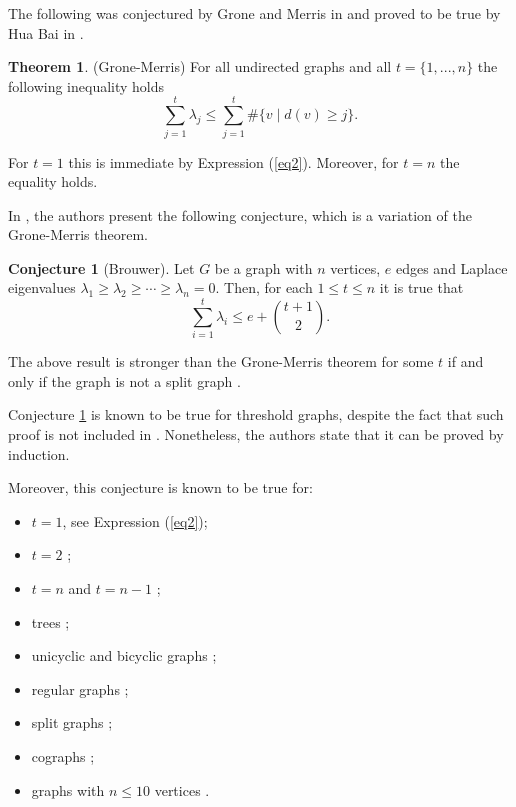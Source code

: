 \documentclass[11pt]{article}
\theoremstyle{definition}
\newtheorem{thm}{Theorem}
\newtheorem{conj}{Conjecture}
\begin{document}
The following was conjectured by Grone and Merris in \cite{GroneMerris} and proved to be true by Hua Bai in \cite{HuaBai}.

\begin{thm}(Grone-Merris)
    For all undirected graphs and all $t = \{1, ..., n\}$ the following inequality holds 
    \begin{equation*}
        \sum_{j=1}^{t} \lambda_j \leq \sum_{j=1}^{t} \#\{ v \mid d(v) \geq j\}.
    \end{equation*}
\end{thm}

For $t=1$ this is immediate by Expression (\ref{eq2}). Moreover, for $t = n$ the equality holds.

In \cite{BrouwerHaemers:2011}, the authors present the following conjecture, which is a variation of the Grone-Merris theorem.

\begin{conj}[Brouwer]\label{brouwer}
Let $G$ be a graph with $n$ vertices, $e$ edges and Laplace eigenvalues $\lambda_1 \geq \lambda_2 \geq \cdots \geq \lambda_n = 0$. Then, for each $1 \leq t \leq n$ it is true that 
\begin{equation*}
    \sum_{i=1}^{t} \lambda_i \leq e + {t+1 \choose 2}.
\end{equation*}
\end{conj}

The above result is stronger than the Grone-Merris theorem for some $t$ if and only if the graph is not a split graph \cite{Mayank}.

Conjecture \ref{brouwer} is known to be true for threshold graphs, despite the fact that such proof is not included in \cite{GroneMerris}. Nonetheless, the authors state that it can be proved by induction. 

Moreover, this conjecture is known to be true for: 
\begin{itemize}[label=\raisebox{0.25ex}{\tiny$\bullet$}]
    \item $t=1$, see Expression (\ref{eq2});
    \item $t=2$ \cite{Haemers:Mohammadian};
    \item $t=n$ and $t=n-1$ \cite{Wang:Huang:Liu};
    \item trees \cite{Fritscher:Hoppen:Rocha:Trevisan};
    \item unicyclic and bicyclic graphs \cite{DuZhou:2012,Wang:Huang:Liu};
    \item regular graphs \cite{Berndsen,Mayank};
    \item split graphs \cite{Berndsen,Mayank};
    \item cographs \cite{Berndsen,Mayank};
    \item graphs with $n \leq 10$ vertices \cite{Berndsen,Mayank}.
\end{itemize}
\end{document}
